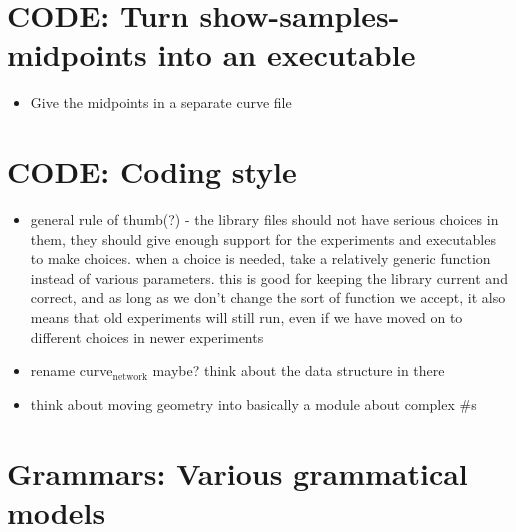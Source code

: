 \documentclass{book}
\begin{document}
\section{CODE: Turn show-samples-midpoints into an executable}
\label{sec-7_4}

\begin{itemize}
\item Give the midpoints in a separate curve file
\end{itemize}
\section{CODE: Coding style}
\label{sec-7_5}

\begin{itemize}
\item general rule of thumb(?) - the library files should not have
    serious choices in them, they should give enough support for the
    experiments and executables to make choices. when a choice is
    needed, take a relatively generic function instead of various
    parameters. this is good for keeping the library current and
    correct, and as long as we don't change the sort of function we
    accept, it also means that old experiments will still run, even if
    we have moved on to different choices in newer experiments
\item rename curve$_{\mathrm{network}}$ maybe? think about the data structure in there
\item think about moving geometry into basically a module about complex \#s
\end{itemize}
\section{Grammars: Various grammatical models}
\label{sec-7_6}
\end{document}
